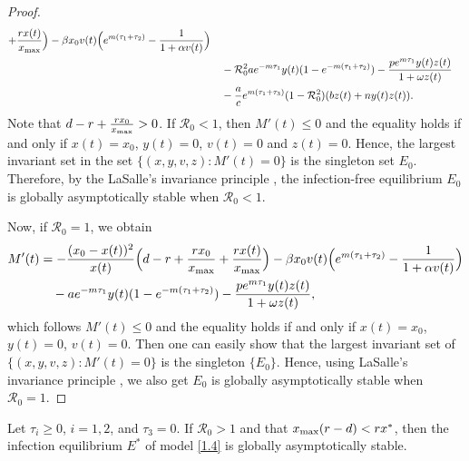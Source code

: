 \documentclass[reqno]{amsart}
\begin{document}
\begin{proof}
\begin{align*}
 +\frac{rx(t)}{x_{\rm max}}\Big)-\beta x_0v(t)\Big(e^{m(\tau_1+\tau_2)}
 -\frac{1}{1+\alpha v(t)}\Big)\\
&\quad -\mathcal{R}_0^{2}ae^{-m\tau_1}y(t)(1-e^{-m(\tau_1+\tau_2)})
 -\frac{pe^{m\tau_{1}} y(t)z(t)}{1+\omega z(t)}\\
&\quad -\frac{a}{c}e^{m(\tau_1+\tau_3)}(1-\mathcal{R}_0^{2})(bz(t)+ny(t)z(t)).
\end{align*}
Note that $d-r+\frac{rx_0}{x_{\rm max}}>0$. 
If $\mathcal{R}_0<1$, then $M'(t)\leqslant0$ and the equality holds if and only if 
 $x(t)=x_0$, $y(t)=0$, $v(t)=0$ and $z(t)=0$. 
Hence, the largest invariant set in the set $\{(x,y,v,z)\!: M'(t)=0\}$
is the singleton set $E_0$. Therefore, by the LaSalle's invariance 
principle \cite{HV}, the infection-free equilibrium $E_0$ is
globally asymptotically stable when $\mathcal{R}_0<1$.

Now, if $\mathcal{R}_0=1$, we obtain
\begin{align*}
M'(t)
&= -\frac{(x_0-x(t))^{2}}{x(t)}\Big(d-r+\frac{rx_0}{x_{\rm max}}
 +\frac{rx(t)}{x_{\rm max}}\Big)-\beta x_0v(t)\Big(e^{m(\tau_1+\tau_2)}
 -\frac{1}{1+\alpha v(t)}\Big)\\
&\quad -ae^{-m\tau_1}y(t)(1-e^{-m(\tau_1+\tau_2)})
 -\frac{pe^{m\tau_{1}} y(t)z(t)}{1+\omega z(t)},
\end{align*}
which follows $M'(t)\leqslant0$ and the equality holds if and only if  $x(t)=x_0$, 
$y(t)=0$, $v(t)=0$. Then one can easily show that the largest invariant set of
$\{(x,y,v,z): M'(t)=0\}$ is the singleton $\{E_0\}$. Hence, using LaSalle's 
invariance principle \cite{HV}, we also get $E_0$ is globally asymptotically
stable when $\mathcal{R}_0=1$.
\end{proof}

\begin{theorem}\label{T3.4}
Let $\tau_{i}\geqslant0$, $i=1,2$, and $\tau_3=0$.  If $\mathcal{R}_0> 1$ and that 
$x_{\rm max}(r-d)<rx^{*}$, then the infection equilibrium $E^{*}$ of model 
\eqref{1.4} is globally asymptotically stable.
\end{theorem}
\end{document}
